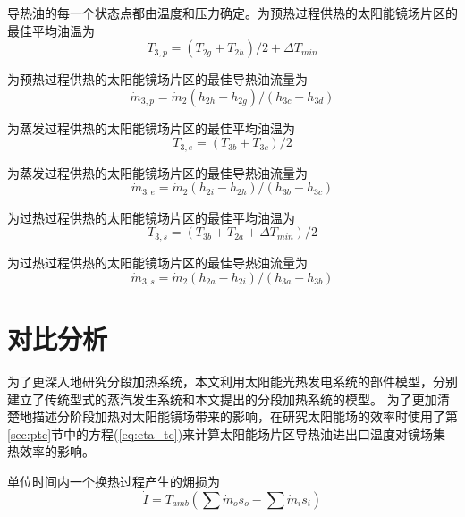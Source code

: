 导热油的每一个状态点都由温度和压力确定。为预热过程供热的太阳能镜场片区的最佳平均油温为
\begin{equation}
  T_{3,p} = (T_{2g} + T_{2h})/2 + \Delta T_{min}
\end{equation}

为预热过程供热的太阳能镜场片区的最佳导热油流量为
\begin{equation}
  \dot{m}_{3,p} = \dot{m}_{2}(h_{2h} - h_{2g})/(h_{3c} - h_{3d})
\end{equation}

为蒸发过程供热的太阳能镜场片区的最佳平均油温为
\begin{equation}
  T_{3,e} = (T_{3b} + T_{3c})/2
\end{equation}

为蒸发过程供热的太阳能镜场片区的最佳导热油流量为
\begin{equation}
  \dot{m}_{3,e} = \dot{m}_{2}(h_{2i} - h_{2h})/(h_{3b} - h_{3c})
  \label{eq:m_3e}
\end{equation}

为过热过程供热的太阳能镜场片区的最佳平均油温为
\begin{equation}
  T_{3,s} = (T_{3b} + T_{2a} + \Delta T_{min})/2
\end{equation}

为过热过程供热的太阳能镜场片区的最佳导热油流量为
\begin{equation}
  \dot{m}_{3,s} = \dot{m}_{2}(h_{2a} - h_{2i})/(h_{3a} - h_{3b})
\end{equation}

\section{对比分析}

为了更深入地研究分段加热系统，本文利用太阳能光热发电系统的部件模型，分别建立了传统型式的蒸汽发生系统和本文提出的分段加热系统的模型。
为了更加清楚地描述分阶段加热对太阳能镜场带来的影响，在研究太阳能场的效率时使用了第\ref{sec:ptc}节中的方程(\ref{eq:eta_tc})来计算太阳能场片区导热油进出口温度对镜场集热效率的影响。

单位时间内一个换热过程产生的㶲损为
\begin{equation}
  \dot{I} = T_{amb} (\sum \dot{m}_os_o - \sum \dot{m}_is_i)
  \label{eq:dot_I}
\end{equation}

